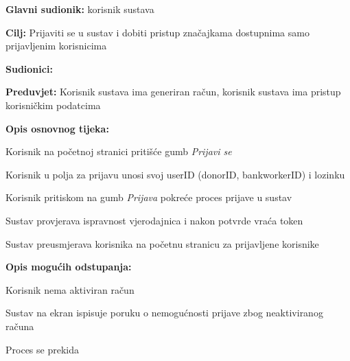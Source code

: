 					\noindent {}
					\begin{packed_item}  \label{UC3.1}
	
						\item \textbf{Glavni sudionik: }korisnik sustava
						\item  \textbf{Cilj:} Prijaviti se u sustav i dobiti pristup značajkama dostupnima samo prijavljenim korisnicima
						\item  \textbf{Sudionici:} 
						\item  \textbf{Preduvjet:} Korisnik sustava ima generiran račun, korisnik sustava ima pristup korisničkim podatcima
						\item  \textbf{Opis osnovnog tijeka:}
						
						\item[] \begin{packed_enum}
	                        \item Korisnik na početnoj stranici pritišće gumb \textit{Prijavi se}
	                        \item Korisnik u polja za prijavu unosi svoj userID (donorID, bankworkerID) i lozinku
	                        \item Korisnik pritiskom na gumb \textit{Prijava} pokreće proces prijave u sustav
	                        \item Sustav provjerava ispravnost vjerodajnica i nakon potvrde vraća token
	                        \item Sustav preusmjerava korisnika na početnu stranicu za prijavljene korisnike
						\end{packed_enum}
						
						\item  \textbf{Opis mogućih odstupanja:}
						\item[] \begin{packed_enum}
						
	                        \item[4.a] Korisnik nema aktiviran račun
	                        \item[] \begin{packed_enum}
    	                        \item Sustav na ekran ispisuje poruku o nemogućnosti prijave zbog neaktiviranog računa
    	                        \item Proces se prekida
					    	\end{packed_enum}
					    	

\end{packed_enum}
\end{packed_item}
